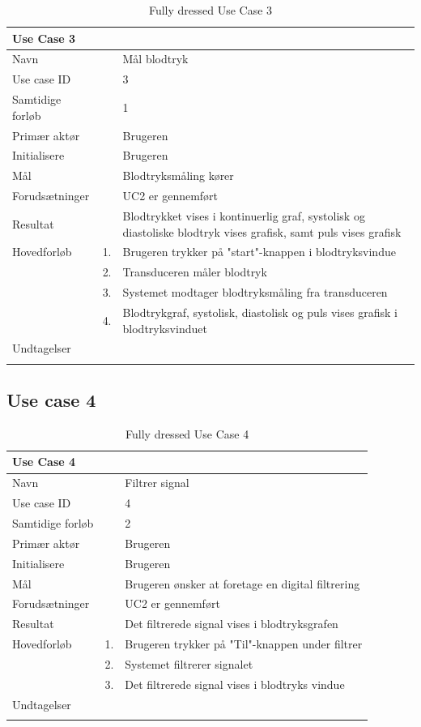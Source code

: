 \begin{longtabu} to  %
    {\large \textbf{Use Case 3}} && \\
    \toprule
    Navn &&    Mål blodtryk\\
    Use case ID &&    3\\
    Samtidige forløb &&    1\\
    Primær aktør &&    Brugeren\\
    Initialisere &&    Brugeren\\
    Mål && Blodtryksmåling kører\\
    Forudsætninger && UC2 er gennemført\\
    Resultat &&    Blodtrykket vises i kontinuerlig graf, systolisk og diastoliske blodtryk vises grafisk, samt puls vises grafisk                     \\ \midrule
    Hovedforløb &    1. &    Brugeren trykker på "start"\--knappen i blodtryksvindue\\
    			& 	 2. & Transduceren måler blodtryk\\
    			&	 3. & Systemet modtager blodtryksmåling fra transduceren\\
    			& 	 4. & Blodtrykgraf, systolisk, diastolisk og puls vises grafisk i blodtryksvinduet\\ \midrule               
    Undtagelser &     &  \\ \bottomrule
\caption{Fully dressed Use Case 3}
\label{UC3}
\end{longtabu}

\subsection{Use case 4}

\begin{longtabu} to  %
    {\large \textbf{Use Case 4}} && \\
    \toprule
    Navn &&    Filtrer signal\\
    Use case ID &&    4\\
    Samtidige forløb &&    2\\
    Primær aktør &&    Brugeren\\
    Initialisere &&    Brugeren\\
    Mål && Brugeren ønsker at foretage en digital filtrering\\
    Forudsætninger && UC2 er gennemført\\
    Resultat &&    Det filtrerede signal vises i blodtryksgrafen                    \\ \midrule
    Hovedforløb &    1. &    Brugeren trykker på "Til"\--knappen under filtrer\\
    			&	 2. & 	 Systemet filtrerer signalet\\
    			&	 3. 	&	 Det filtrerede signal vises i blodtryks vindue \\ \midrule               
    Undtagelser &    \\ \bottomrule
\caption{Fully dressed Use Case 4}
\label{UC4}
\end{longtabu}

